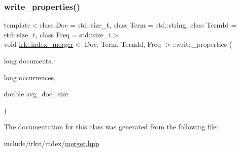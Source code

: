 \subsubsection{\texorpdfstring{write\+\_\+properties()}{write\_properties()}}
{\footnotesize\ttfamily template$<$class Doc = std\+::size\+\_\+t, class Term = std\+::string, class Term\+Id = std\+::size\+\_\+t, class Freq = std\+::size\+\_\+t$>$ \\
void \mbox{\hyperlink{classirk_1_1index__merger}{irk\+::index\+\_\+merger}}$<$ Doc, Term, Term\+Id, Freq $>$\+::write\+\_\+properties (\begin{DoxyParamCaption}\item[{long}]{documents,  }\item[{long}]{occurrences,  }\item[{double}]{avg\+\_\+doc\+\_\+size }\end{DoxyParamCaption})\hspace{0.3cm}{\ttfamily [inline]}}



The documentation for this class was generated from the following file\+:\begin{DoxyCompactItemize}
\item 
include/irkit/index/\mbox{\hyperlink{merger_8hpp}{merger.\+hpp}}\end{DoxyCompactItemize}
